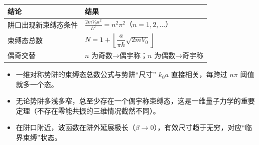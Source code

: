 \begin{formulabox}[答案汇总]
\begin{center}
\begin{tabular}{ll}
\toprule
\textbf{结论} & \textbf{结果} \\
\midrule
阱口出现新束缚态条件 & $\displaystyle\frac{2mV_0a^2}{\hbar^2}=n^2\pi^2$（$n=1,2,\ldots$） \\
束缚态总数 & $N=1+\left\lfloor\dfrac{a}{\pi\hbar}\sqrt{2mV_0}\right\rfloor$ \\
偶奇交替 & $n$ 为奇数→偶宇称；$n$ 为偶数→奇宇称 \\
\bottomrule
\end{tabular}
\end{center}
\end{formulabox}

\begin{insightbox}[物理图像]
\begin{itemize}
    \item 一维对称势阱的束缚态总数公式与势阱``尺寸'' $k_0a$ 直接相关，每跨过 $n\pi$ 阈值就多一个态。
    \item 无论势阱多浅多窄，总至少存在一个偶宇称束缚态，这是一维量子力学的重要定理（不存在零能共振的三维情况截然不同）。
    \item 在阱口附近，波函数在阱外延展极长（$\beta\to0$），有效尺寸趋于无穷，对应``临界束缚''状态。
\end{itemize}
\end{insightbox}
